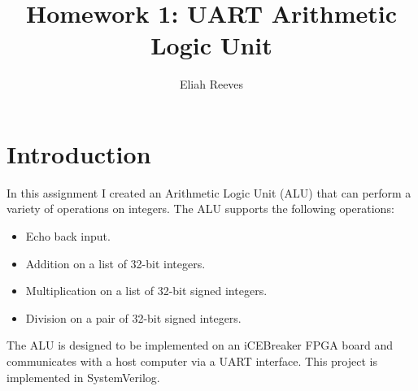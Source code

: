 \documentclass{article}
\title{Homework 1: UART Arithmetic Logic Unit}
\author{{Eliah Reeves}}
\date{\vspace{-5ex}} %
\begin{document}
\maketitle
\thispagestyle{firstpage}
\section{Introduction}

In this assignment I created an Arithmetic Logic Unit (ALU) that can perform a variety of operations on integers. The ALU supports the following operations:
\begin{itemize}
    \item Echo back input.
    \item Addition on a list of 32-bit integers.
    \item Multiplication on a list of 32-bit signed integers.
    \item Division on a pair of 32-bit signed integers.
\end{itemize}
The ALU is designed to be implemented on an iCEBreaker FPGA board and communicates with a host computer via a UART interface. This project is implemented in SystemVerilog.
\end{document}
